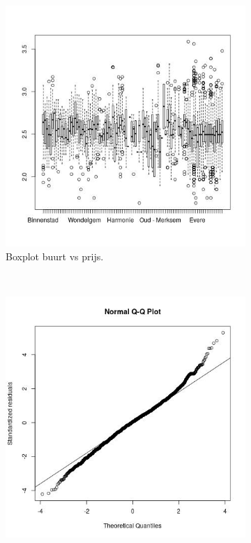 \documentclass[a4paper,kulak]{kulakarticle} %
\begin{document}
\begin{figure}[H]
	\centering
	\begin{subfigure}[b]{0.3\textwidth}
		\includegraphics[width=\textwidth]{boxne.jpg}
		\caption{Boxplot buurt vs prijs.}
		\label{fig:boxne}
	\end{subfigure}
	~ %
	\begin{subfigure}[b]{0.3\textwidth}
		\includegraphics[width=\textwidth]{qqne.jpg}

\end{subfigure}
\end{figure}
\end{document}
